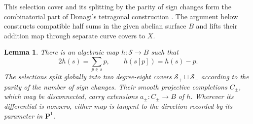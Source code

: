 \documentclass[11pt]{amsart}
\newcommand{\PP}{\mathbf P}
\newtheorem{lemma}[theorem]{Lemma}
\theoremstyle{definition}
\theoremstyle{remark}
\numberwithin{equation}{section}
\begin{document}
This selection cover and its splitting by the parity of sign changes
form the combinatorial part of Donagi's tetragonal construction
\cite[Sections~2.1--2.2 and~2.5]{DonagiPrym}.
The argument below constructs compatible half sums in the given
abelian surface $B$ and lifts their addition map through separate
curve covers to $X$.

\begin{lemma}\label{geom:halves}
There is an algebraic map $h:\mathcal S\to B$ such that
\begin{equation}\label{geom:coherent}
 2h(s)=\sum_{p\in s}p,\qquad h(s[p])=h(s)-p.
\end{equation}
The selections split globally into two degree-eight covers
$\mathcal S_+\sqcup\mathcal S_-$ according to the parity of the number
of sign changes.  Their smooth projective completions $C_\pm$, which
may be disconnected, carry extensions $a_\pm:C_\pm\to B$ of $h$.
Wherever its differential is nonzero, either map is tangent to the
direction recorded by its parameter in $\PP^1$.
\end{lemma}
\end{document}
